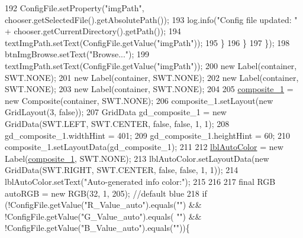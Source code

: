 \begin{DoxyCode}
192                     ConfigFile.setProperty(\textcolor{stringliteral}{"imgPath"}, chooser.getSelectedFile().getAbsolutePath());
193                     log.info(\textcolor{stringliteral}{"Config file updated: "} + chooser.getCurrentDirectory().getPath());
194                     textImgPath.setText(ConfigFile.getValue(\textcolor{stringliteral}{"imgPath"}));
195                 \}
196             \}
197         \});
198         btnImgBrowse.setText(\textcolor{stringliteral}{"Browse..."});
199         textImgPath.setText(ConfigFile.getValue(\textcolor{stringliteral}{"imgPath"}));
200         \textcolor{keyword}{new} Label(container, SWT.NONE);
201         \textcolor{keyword}{new} Label(container, SWT.NONE);
202         \textcolor{keyword}{new} Label(container, SWT.NONE);
203         \textcolor{keyword}{new} Label(container, SWT.NONE);
204         
205         \hyperlink{classit_1_1isislab_1_1masonassisteddocumentation_1_1mason_1_1wizards_1_1_b___project_information_page_a89067957695a1743c11b64ff76f1e5c9}{composite\_1} = \textcolor{keyword}{new} Composite(container, SWT.NONE);
206         composite\_1.setLayout(\textcolor{keyword}{new} GridLayout(3, \textcolor{keyword}{false}));
207         GridData gd\_composite\_1 = \textcolor{keyword}{new} GridData(SWT.LEFT, SWT.CENTER, \textcolor{keyword}{false}, \textcolor{keyword}{false}, 1, 1);
208         gd\_composite\_1.widthHint = 401;
209         gd\_composite\_1.heightHint = 60;
210         composite\_1.setLayoutData(gd\_composite\_1);
211         
212         \hyperlink{classit_1_1isislab_1_1masonassisteddocumentation_1_1mason_1_1wizards_1_1_b___project_information_page_a9c18ade9b232612291e8a831823a29cf}{lblAutoColor} = \textcolor{keyword}{new} Label(\hyperlink{classit_1_1isislab_1_1masonassisteddocumentation_1_1mason_1_1wizards_1_1_b___project_information_page_a89067957695a1743c11b64ff76f1e5c9}{composite\_1}, SWT.NONE);
213         lblAutoColor.setLayoutData(\textcolor{keyword}{new} GridData(SWT.RIGHT, SWT.CENTER, \textcolor{keyword}{false}, \textcolor{keyword}{false}, 1, 1));
214         lblAutoColor.setText(\textcolor{stringliteral}{"Auto-generated info color:"});
215 
216         
217         \textcolor{keyword}{final} RGB autoRGB = \textcolor{keyword}{new} RGB(32, 1, 205);    \textcolor{comment}{//default blue}
218         \textcolor{keywordflow}{if} (!ConfigFile.getValue(\textcolor{stringliteral}{"R\_Value\_auto"}).equals(\textcolor{stringliteral}{""}) && !ConfigFile.getValue(\textcolor{stringliteral}{"G\_Value\_auto"}).equals(\textcolor{stringliteral}{
      ""}) && !ConfigFile.getValue(\textcolor{stringliteral}{"B\_Value\_auto"}).equals(\textcolor{stringliteral}{""}))\{

\end{DoxyCode}
